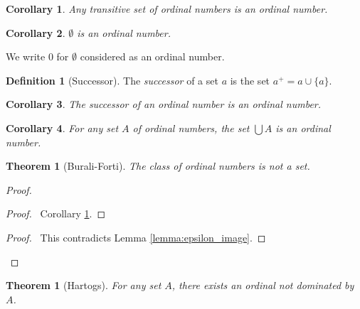 \documentclass{report}
\let\qed\relax
\newtheorem{theorem}[axiom]{Theorem}
\newtheorem{corollary}{Corollary}[axiom]
\theoremstyle{definition}
\newtheorem{definition}[axiom]{Definition}
\begin{document}
    \begin{corollary}
        \label{corollary:set_of_ordinals}
        Any transitive set of ordinal numbers is an ordinal number.
    \end{corollary}

    \begin{corollary}
        $\emptyset$ is an ordinal number.
    \end{corollary}

    We write 0 for $\emptyset$ considered as an ordinal number.

    \begin{definition}[Successor]
        The \emph{successor} of a set $a$ is the set $a^+ = a \cup \{ a \}$.
    \end{definition}

    \begin{corollary}
        The successor of an ordinal number is an ordinal number.
    \end{corollary}

    \begin{corollary}
        For any set $A$ of ordinal numbers, the set $\bigcup A$ is an ordinal number.
    \end{corollary}

    \begin{theorem}[Burali-Forti]
        The class of ordinal numbers is not a set.
    \end{theorem}

    \begin{proof}
        \pf
        \begin{proof}
            \pf\ Corollary \ref{corollary:set_of_ordinals}.
        \end{proof}
        \qedstep
        \begin{proof}
            \pf\ This contradicts Lemma \ref{lemma:epsilon_image}.
        \end{proof}
        \qed
    \end{proof}

    \begin{theorem}[Hartogs]
        For any set $A$, there exists an ordinal not dominated by $A$.
    \end{theorem}
\end{document}
